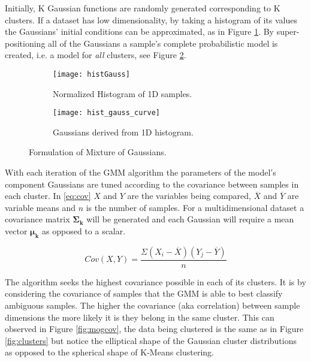 Initially, K Gaussian functions are randomly generated corresponding to K clusters. If a dataset has low dimensionality, by taking a histogram of its values the Gaussians' initial conditions can be approximated, as in Figure \ref{fig:histGauss}. By super-positioning all of the Gaussians a sample's complete probabilistic model is created, i.e. a model for \emph{all} clusters, see Figure \ref{fig:histCurve}. 

\begin{figure}[H]
	\centering
	\begin{subfigure}[b]{0.5\linewidth}
            \centering\texttt{[image: histGauss]}
      		\caption{Normalized Histogram of 1D samples.}
		\label{fig:histGauss}
    	\end{subfigure}%
    	\begin{subfigure}[b]{0.5\linewidth}
      		\centering\texttt{[image: hist\_gauss\_curve]}
      		\caption{Gaussians derived from 1D histogram.}
       		\label{fig:histCurve}
		\end{subfigure}
		\caption{Formulation of Mixture of Gaussians.}
    	\label{fig:mixture}
\end{figure}

With each iteration of the GMM algorithm the parameters of the model's component Gaussians are tuned according to the covariance between samples in each cluster. In \ref{eq:cov} $X$ and $Y$ are the variables being compared, $\overline X$ and $\overline Y$ are variable means and $n$ is the number of samples. For a multidimensional dataset a covariance matrix $\bm{\Sigma_k}$ will be generated and each Gaussian will require a mean vector $\bm{\mu_k}$ as opposed to a scalar. 

\begin{equation}
Cov(X, Y) = \frac{\Sigma(X_i-\overline X)(Y_j-\overline Y)}{n}
\label{eq:cov}
\end{equation}



The algorithm seeks the highest covariance possible in each of its clusters. It is by considering the covariance of samples that the GMM is able to best classify ambiguous samples. The higher the covariance (aka correlation) between sample dimensions the more likely it is they belong in the same cluster. This can observed in Figure \ref{fig:mogcov}, the data being clustered is the same as in Figure \ref{fig:clusters} but notice the elliptical shape of the Gaussian cluster distributions as opposed to the spherical shape of K-Means clustering.

